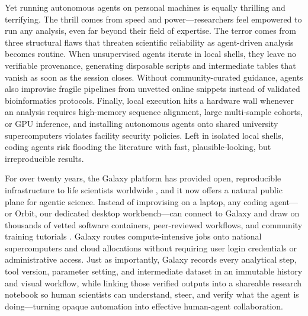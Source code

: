 \documentclass[11pt,letterpaper]{article}
\begin{document}
Yet running autonomous agents on personal machines is equally thrilling and terrifying. The thrill comes from speed and power---researchers feel empowered to run any analysis, even far beyond their field of expertise. The terror comes from three structural flaws that threaten scientific reliability as agent-driven analysis becomes routine. When unsupervised agents iterate in local shells, they leave no verifiable provenance, generating disposable scripts and intermediate tables that vanish as soon as the session closes. Without community-curated guidance, agents also improvise fragile pipelines from unvetted online snippets instead of validated bioinformatics protocols. Finally, local execution hits a hardware wall whenever an analysis requires high-memory sequence alignment, large multi-sample cohorts, or GPU inference, and installing autonomous agents onto shared university supercomputers violates facility security policies. Left in isolated local shells, coding agents risk flooding the literature with fast, plausible-looking, but irreproducible results.

For over twenty years, the Galaxy platform has provided open, reproducible infrastructure to life scientists worldwide \cite{galaxy2024}, and it now offers a natural public plane for agentic science. Instead of improvising on a laptop, any coding agent---or Orbit, our dedicated desktop workbench---can connect to Galaxy and draw on thousands of vetted software containers, peer-reviewed workflows, and community training tutorials \cite{biocontainers2017, iuc2026, iwc2026, batut2018, hiltemann2023, foundry2026}. Galaxy routes compute-intensive jobs onto national supercomputers and cloud allocations without requiring user login credentials or administrative access. Just as importantly, Galaxy records every analytical step, tool version, parameter setting, and intermediate dataset in an immutable history and visual workflow, while linking those verified outputs into a shareable research notebook so human scientists can understand, steer, and verify what the agent is doing---turning opaque automation into effective human-agent collaboration.
\end{document}
